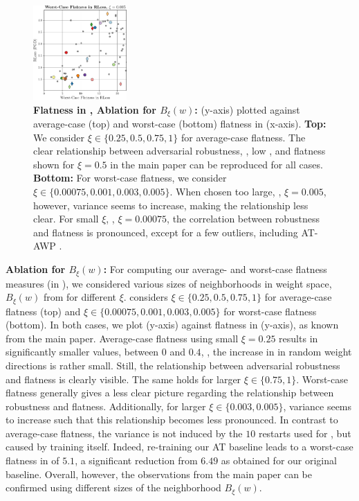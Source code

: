 \begin{figure}[t]
\begin{minipage}[t]{0.22\textwidth}
		\includegraphics[height=3.6cm]{plots_supp_flatness_correlation_joint_loss_e0005}
	\end{minipage}
	\caption{\textbf{Flatness in \RCE, Ablation for $B_\xi(w)$:} \RCE(y-axis) plotted against average-case (top) and worst-case (bottom) flatness in \RCE (x-axis).
	\textbf{Top:} We consider $\xi \in \{0.25, 0.5, 0.75, 1\}$ for average-case flatness. The clear relationship between adversarial robustness, \ie, low \RCE, and flatness shown for $\xi = 0.5$ in the main paper can be reproduced for all cases. \textbf{Bottom:} For worst-case flatness, we consider $\xi \in \{0.00075, 0.001, 0.003, 0.005\}$. When chosen too large, \eg, $\xi = 0.005$, however, variance seems to increase, making the relationship less clear. For small $\xi$, \eg, $\xi = 0.00075$, the correlation between robustness and flatness is pronounced, except for a few outliers, including AT-AWP \cite{WuNIPS2020}.}
	\label{fig:supp-flatness-ablation}
\end{figure}

\textbf{Ablation for $B_\xi(w)$:}
%
For computing our average- and worst-case flatness measures (in \RCE), we considered various sizes of neighborhoods in weight space, \ie $B_\xi(w)$ from  for different $\xi$.  considers $\xi \in \{0.25, 0.5, 0.75, 1\}$ for average-case flatness (top) and $\xi \in \{0.00075, 0.001, 0.003, 0.005\}$ for worst-case flatness (bottom). In both cases, we plot \RCE (y-axis) against flatness in \RCE (y-axis), as known from the main paper. Average-case flatness using small $\xi = 0.25$ results in significantly smaller values, between $0$ and $0.4$, \ie, the increase in \RCE in random weight directions is rather small. Still, the relationship between adversarial robustness and flatness is clearly visible. The same holds for larger $\xi \in \{0.75, 1\}$. Worst-case flatness generally gives a less clear picture regarding the relationship between robustness and flatness.
Additionally, for larger $\xi \in \{0.003, 0.005\}$, variance seems to increase such that this relationship becomes less pronounced. In contrast to average-case flatness, the variance is not induced by the $10$ restarts used for , but caused by training itself. Indeed, re-training our AT baseline leads to a worst-case flatness in \RCE of $5.1$, a significant reduction from $6.49$ as obtained for our original baseline. Overall, however, the observations from the main paper can be confirmed using different sizes of the neighborhood $B_\xi(w)$.

